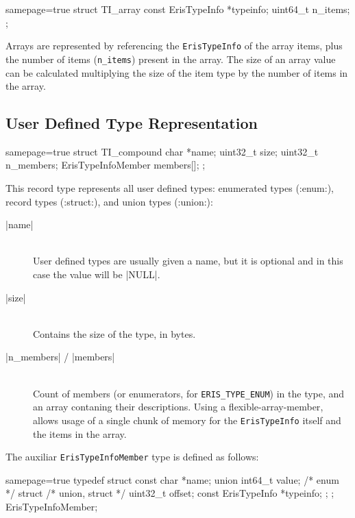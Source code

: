 \begin{ccode*}{samepage=true}
  struct TI_array {
    const ErisTypeInfo *typeinfo;
    uint64_t            n_items;
  };
\end{ccode*}

\noindent
Arrays are represented by referencing the \verb|ErisTypeInfo| of the array
items, plus the number of items (\verb|n_items|) present in the array. The
size of an array value can be calculated multiplying the size of the item type
by the number of items in the array.


\subsection{User Defined Type Representation}

\begin{ccode*}{samepage=true}
  struct TI_compound {
    char              *name;
    uint32_t           size;
    uint32_t           n_members;
    ErisTypeInfoMember members[];
  };
\end{ccode*}

\noindent This record type represents all user defined types: enumerated types
(\Mc:enum:), record types (\Mc:struct:), and union types (\Mc:union:):

\begin{description}
  \item [\Mc|name|] \hfill \\
    User defined types are usually given a name, but it is optional and in
    this case the value will be \Mc|NULL|.
  \item [\Mc|size|] \hfill \\
    Contains the size of the type, in bytes.
  \item [\Mc|n_members| / \Mc|members|] \hfill \\
    Count of members (or enumerators, for \verb|ERIS_TYPE_ENUM|) in the type,
    and an array contaning their descriptions. Using
    a \gls{flexible-array-member}, allows usage of a single chunk of memory
    for the \verb|ErisTypeInfo| itself and the items in the array.
\end{description}

\noindent
The auxiliar \verb|ErisTypeInfoMember| type is defined as follows:

\begin{ccode*}{samepage=true}
  typedef struct {
    const char             *name;
    union {
      int64_t               value; /* enum */
      struct {                     /* union, struct */
        uint32_t            offset;
        const ErisTypeInfo *typeinfo;
      };
    };
  } ErisTypeInfoMember;
\end{ccode*}


